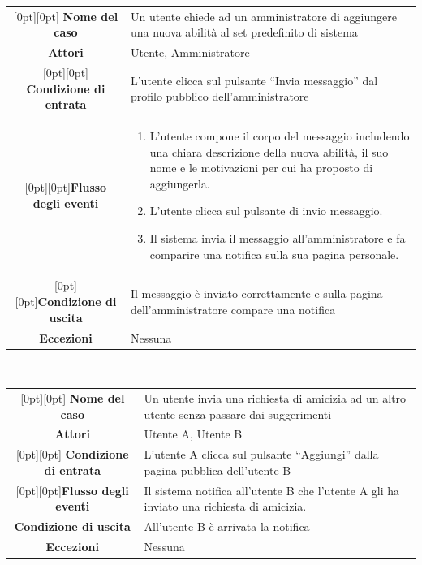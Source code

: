 \documentclass[a4paper,12pt]{article}
\begin{document}
\begin{tabularx}{\textwidth}{|c|X|}
\rowcolor[gray]{.9}\hline \raisebox{-1ex}[0pt][0pt]{ \textbf{Nome del caso}} & Un utente chiede ad un amministratore di aggiungere una nuova abilità al set predefinito di sistema \\
\rowcolor[gray]{.9}\hline  \textbf{Attori} & Utente, Amministratore \\ 
\rowcolor[gray]{.9}\hline \raisebox{-1ex}[0pt][0pt]{ \textbf{Condizione di entrata}} & L'utente clicca sul pulsante “Invia messaggio” dal profilo pubblico dell'amministratore \\
\rowcolor[gray]{.9}\hline  \raisebox{-10ex}[0pt][0pt]{\textbf{Flusso degli eventi}} & 
\begin{enumerate}
\itemsep0em
\item L'utente compone il corpo del messaggio includendo una chiara descrizione della nuova abilità, il suo nome e le motivazioni per cui ha proposto di aggiungerla.
\item L'utente clicca sul pulsante di invio messaggio.
\item Il sistema invia il messaggio all'amministratore e fa comparire una notifica sulla sua pagina personale.
\end{enumerate}
 \\ 
\rowcolor[gray]{.9}\hline  \raisebox{-1ex}[0pt][0pt]{\textbf{Condizione di uscita}} & Il messaggio è inviato correttamente e sulla pagina dell'amministratore compare una notifica \\
\rowcolor[gray]{.9}\hline  \textbf{Eccezioni} & Nessuna
\\
\hline 
\end{tabularx} \\[3\baselineskip]
\begin{tabularx}{\textwidth}{|c|X|}
\rowcolor[gray]{.9}\hline \raisebox{-1ex}[0pt][0pt]{ \textbf{Nome del caso}} & Un utente invia una richiesta di amicizia ad un altro utente senza passare dai suggerimenti \\
\rowcolor[gray]{.9}\hline  \textbf{Attori} & Utente A, Utente B \\ 
\rowcolor[gray]{.9}\hline \raisebox{-1ex}[0pt][0pt]{ \textbf{Condizione di entrata}} & L'utente A clicca sul pulsante “Aggiungi” dalla pagina pubblica dell'utente B \\
\rowcolor[gray]{.9}\hline  \raisebox{-1ex}[0pt][0pt]{\textbf{Flusso degli eventi}} & Il sistema notifica all'utente B che l'utente A gli ha inviato una richiesta di amicizia.
 \\ 
\rowcolor[gray]{.9}\hline  \textbf{Condizione di uscita} & All'utente B è arrivata la notifica \\
\rowcolor[gray]{.9}\hline  \textbf{Eccezioni} & Nessuna
\\
\hline 
\end{tabularx} \\[3\baselineskip]
\end{document}
